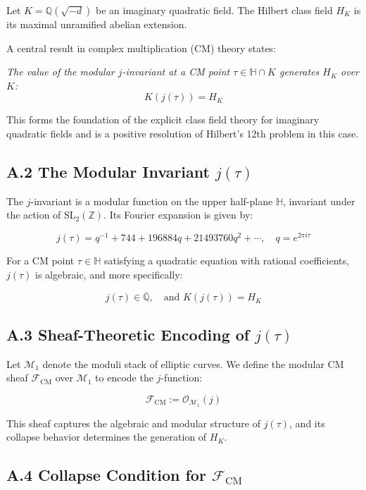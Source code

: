 \documentclass[11pt]{article}
\begin{document}
Let \( K = \mathbb{Q}(\sqrt{-d}) \) be an imaginary quadratic field.  
The Hilbert class field \( H_K \) is its maximal unramified abelian extension.

A central result in complex multiplication (CM) theory states:

\begin{center}
\textit{
The value of the modular \( j \)-invariant at a CM point \( \tau \in \mathbb{H} \cap K \) generates \( H_K \) over \( K \):
\[
K(j(\tau)) = H_K
\]
}
\end{center}

This forms the foundation of the explicit class field theory for imaginary quadratic fields and is a positive resolution of Hilbert's 12th problem in this case.

\subsection*{A.2 The Modular Invariant \( j(\tau) \)}

The \( j \)-invariant is a modular function on the upper half-plane \( \mathbb{H} \), invariant under the action of \( \mathrm{SL}_2(\mathbb{Z}) \).  
Its Fourier expansion is given by:

\[
j(\tau) = q^{-1} + 744 + 196884q + 21493760q^2 + \cdots, \quad q = e^{2\pi i \tau}
\]

For a CM point \( \tau \in \mathbb{H} \) satisfying a quadratic equation with rational coefficients, \( j(\tau) \) is algebraic, and more specifically:

\[
j(\tau) \in \overline{\mathbb{Q}}, \quad \text{and } K(j(\tau)) = H_K
\]

\subsection*{A.3 Sheaf-Theoretic Encoding of \( j(\tau) \)}

Let \( \mathcal{M}_1 \) denote the moduli stack of elliptic curves.  
We define the modular CM sheaf \( \mathcal{F}_{\mathrm{CM}} \) over \( \mathcal{M}_1 \) to encode the \( j \)-function:

\[
\mathcal{F}_{\mathrm{CM}} := \mathcal{O}_{\mathcal{M}_1}(j)
\]

This sheaf captures the algebraic and modular structure of \( j(\tau) \), and its collapse behavior determines the generation of \( H_K \).

\subsection*{A.4 Collapse Condition for \( \mathcal{F}_{\mathrm{CM}} \)}
\end{document}
